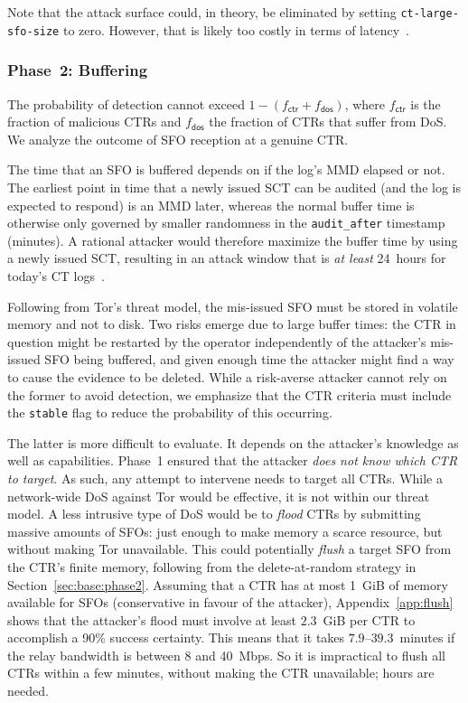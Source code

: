 Note that the attack surface could, in theory, be eliminated by setting
\texttt{ct-large-sfo-size} to zero.  However, that is likely  too costly in
terms of latency~\cite{no-hard-fail}.

\subsubsection{Phase~2: Buffering} \label{sec:analysis:pr:phase2}
The probability of detection cannot exceed $1-(f_{\mathsf{ctr}} +
f_{\mathsf{dos}})$, where $f_{\mathsf{ctr}}$ is the fraction of
malicious CTRs and $f_{\mathsf{dos}}$ the fraction of CTRs that suffer from
DoS.  We analyze the outcome of SFO reception at a genuine CTR\@.

The time that an SFO is buffered depends on if the log's MMD elapsed or not.
The earliest point in time that a newly issued SCT can be audited (and the log
is expected to respond) is an MMD later, whereas the normal buffer time is
otherwise only governed by smaller randomness in the \texttt{audit\_after}
timestamp (minutes).  A rational attacker would therefore maximize the buffer
time by using a newly issued SCT, resulting in an attack window that is \emph{at
least} 24~hours for today's CT logs~\cite{google-log-policy}.

Following from Tor's threat model, the mis-issued SFO must be stored in volatile
memory and not to disk.  Two risks emerge due to large buffer times:
	the CTR in question might be restarted by the operator independently of the
		attacker's mis-issued SFO being buffered,
	and given enough time the attacker might find a way to cause the evidence to
		be deleted.
While a risk-averse attacker cannot rely on the former to avoid detection, we
emphasize that the CTR criteria must include the \texttt{stable} flag to reduce
the probability of this occurring.

The latter is more difficult to evaluate.  It depends on the attacker's
knowledge as well as capabilities.  Phase~1 ensured that the attacker \emph{does
not know which CTR to target}.  As such, any attempt to intervene needs to
target all CTRs.  While a network-wide DoS against Tor would be effective, it is
not within our threat model.  A less intrusive type of DoS would be to
\emph{flood} CTRs by submitting massive amounts of SFOs: just enough to make
memory a scarce resource, but without making Tor unavailable. This could
potentially \emph{flush} a target SFO from the CTR's finite memory, following
from the delete-at-random strategy in Section~\ref{sec:base:phase2}. Assuming
that a CTR has at most 1~GiB of memory available for SFOs (conservative in
favour of the attacker), Appendix~\ref{app:flush} shows that the attacker's
flood must involve at least $2.3$~GiB per CTR to accomplish a 90\% success
certainty.  This means that it takes $7.9$--$39.3$~minutes if the relay
bandwidth is between 8 and 40~Mbps. So it is impractical to flush all CTRs
within a few minutes, without making the CTR unavailable; hours are needed.

